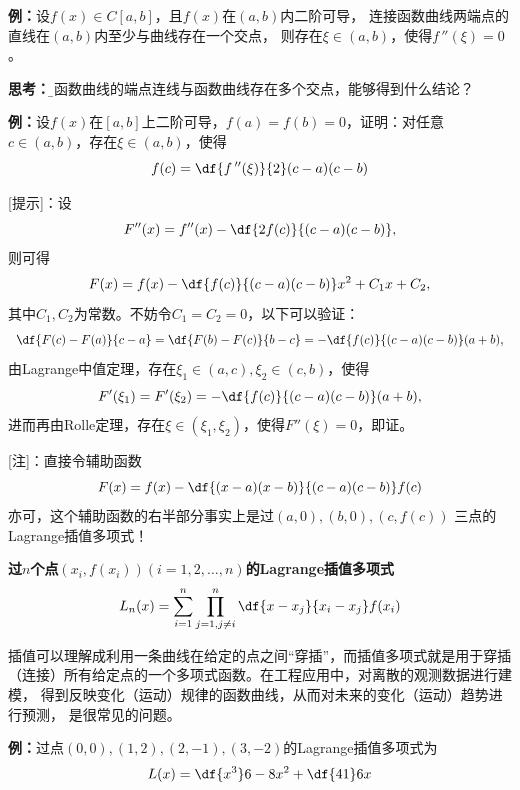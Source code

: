 {\bf 例：}设$f(x)\in C[a,b]$，且$f(x)$在$(a,b)$内二阶可导，
连接函数曲线两端点的直线在$(a,b)$内至少与曲线存在一个交点，
则存在$\xi\in(a,b)$，使得$f\,''(\xi)=0$。

{\bf 思考：}{\b 若函数曲线的端点连线与函数曲线存在多个交点，能够得到什么结论？}

{\bf 例：}设$f(x)$在$[a,b]$上二阶可导，$f(a)=f(b)=0$，证明：对任意
$c\in(a,b)$，存在$\xi\in(a,b)$，使得
$$f(c)=\df{f\,''(\xi)}{2}(c-a)(c-b)$$

[提示]：设
$$F''(x)=f''(x)-\df{2f(c)}{(c-a)(c-b)},$$
则可得
$$F(x)=f(x)-\df{f(c)}{(c-a)(c-b)}x^2+C_1x+C_2,$$
其中$C_1,C_2$为常数。不妨令$C_1=C_2=0$，以下可以验证：
$$\df{F(c)-F(a)}{c-a}=\df{F(b)-F(c)}{b-c}
=-\df{f(c)}{(c-a)(c-b)}(a+b),$$
由Lagrange中值定理，存在$\xi_1\in(a,c),\xi_2\in(c,b)$，使得
$$F'(\xi_1)=F'(\xi_2)=-\df{f(c)}{(c-a)(c-b)}(a+b),$$
进而再由Rolle定理，存在$\xi\in(\xi_1,\xi_2)$，使得$F''(\xi)=0$，即证。

[注]：直接令辅助函数
$$F(x)=f(x)-\df{(x-a)(x-b)}{(c-a)(c-b)}f(c)$$
亦可，这个辅助函数的右半部分事实上是过$(a,0),(b,0),(c,f(c))$
三点的{\kaishu Lagrange插值多项式}！

\begin{shaded}
	\begin{tcolorbox}
		{\bf 过$n$个点$(x_i,f(x_i))(i=1,2,\ldots,n)$的Lagrange插值多项式}
		$$L_n(x)=\sum\limits_{i=1}^n\prod_{j=1,j\ne i}^{n}
		\df{x-x_j}{x_i-x_j}f(x_i)$$
	\end{tcolorbox}
	
	插值可以理解成利用一条曲线在给定的点之间“穿插”，而插值多项式就是用于穿插
	（连接）所有给定点的一个多项式函数。在工程应用中，对离散的观测数据进行建模，
	得到反映变化（运动）规律的函数曲线，从而对未来的变化（运动）趋势进行预测，
	是很常见的问题。
	
	{\bf 例：}过点$(0,0),(1,2),(2,-1),(3,-2)$的Lagrange插值多项式为
	$$L(x)=\df{x^3}6-8x^2+\df{41}6x$$
	
	\begin{center}
	\end{center}
\end{shaded}

